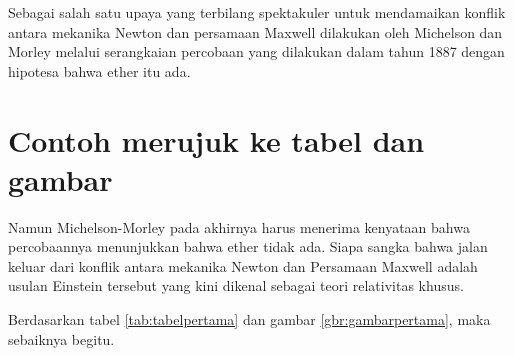 Sebagai salah satu upaya yang terbilang spektakuler untuk mendamaikan konflik antara mekanika Newton dan persamaan Maxwell dilakukan oleh Michelson dan Morley melalui serangkaian percobaan yang dilakukan dalam tahun 1887 dengan hipotesa bahwa ether itu ada. 

\section{Contoh merujuk ke tabel dan gambar}

Namun Michelson-Morley pada akhirnya harus menerima kenyataan bahwa percobaannya menunjukkan bahwa ether tidak ada. Siapa sangka bahwa jalan keluar dari konflik antara mekanika Newton dan Persamaan Maxwell adalah usulan Einstein tersebut yang kini dikenal sebagai teori relativitas khusus. 

Berdasarkan tabel \ref{tab:tabelpertama} dan gambar \ref{gbr:gambarpertama}, maka sebaiknya begitu.